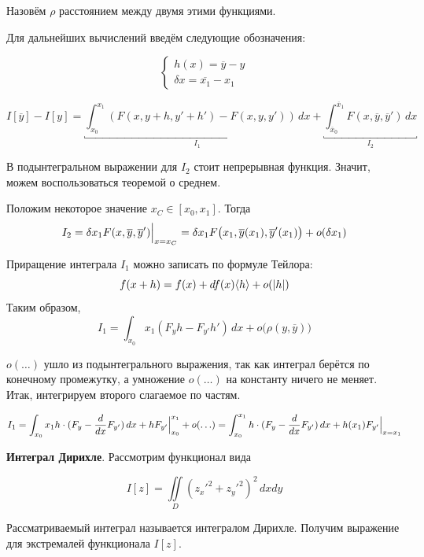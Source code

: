 \documentclass[12pt]{article}
\begin{document}
	Назовём $\rho$ расстоянием между двумя этими функциями.
	
	Для дальнейших вычислений введём следующие обозначения:
	
	$$
			\left\{
			\begin{aligned}
					h(x) = \overline{y} - y \\
					\delta x = \overline{x_1} - x_1
			\end{aligned}
			\right.
	$$
	
	$$I[\overline{y}] - I[y] = 
	  \underbracket{\int_{x_0}^{x_1} (F(x, y + h, y' + h') - F(x, y, y')) \,dx}_{I_1} +
	  \underbracket{\int_{\overline{x}_0}^{\overline{x}_1} F(x, \overline{y}, \overline{y}') \,dx}_{I_2}$$
	  
	В подынтегральном выражении для $I_2$ стоит непрерывная функция. Значит, можем воспользоваться теоремой о среднем.
	
	
	Положим некоторое значение $x_C \in [x_0, x_1]$. Тогда 
	$$I_2 = \delta x_1 F(x, \overline{y}, \overline{y}')\Big|_{x = x_C}^{} 
	= \delta x_1 F\big(x_1, \overline{y}(x_1), \overline{y}'(x_1)\big) + o(\delta x_1)$$
	
	Приращение интеграла $I_1$ можно записать по формуле Тейлора:
	$$f(x + h) = f(x) + df(x) \langle h \rangle + o(\left| h \right|)$$
	Таким образом, 
	$$I_1 = \int_{x_0}{x_1} (F_yh - F_{y'}h') \,dx + o\big(\rho(y, \overline{y})\big)$$
	
	$o(\ldots)$ ушло из подынтегрального выражения, так как интеграл берётся по конечному промежутку, а 
	умножение $o(\ldots)$ на константу ничего не меняет. Итак, интегрируем второго слагаемое по частям.
	
	$$I_1 = \int_{x_0}{x_1} h\cdot(F_y - \frac{d}{dx}F_{y'}) \,dx + hF_{y'}\Big|_{x_0}^{x_1} + o(\ldots) = 
	  \int_{x_0}^{x_1} h\cdot(F_y - \frac{d}{dx}F_{y'}) \,dx + h(x_1) F_{y'}\Big|_{x = x_1}^{}$$
	  
	
	\textbf{Интеграл Дирихле}. Рассмотрим функционал вида 
	
	$$I[z] = \iint\limits_D (z_x'^2 + z_y'^2)^2 \,dxdy$$
	
	Рассматриваемый интеграл называется интегралом Дирихле. Получим выражение 
	для экстремалей функционала $I[z]$.
	
\end{document}
